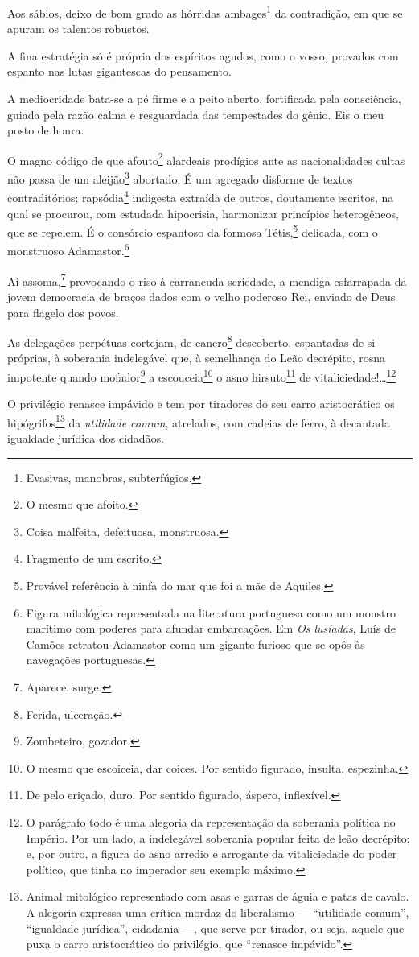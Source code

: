 Aos sábios, deixo de bom grado as hórridas ambages\footnote{Evasivas,
  manobras, subterfúgios.} da contradição, em que se apuram os talentos
robustos.

A fina estratégia só é própria dos espíritos agudos, como o vosso,
provados com espanto nas lutas gigantescas do pensamento.

A mediocridade bata-se a pé firme e a peito aberto, fortificada pela
consciência, guiada pela razão calma e resguardada das tempestades do
gênio. Eis o meu posto de honra.

O magno código de que afouto\footnote{O mesmo que afoito.} alardeais
prodígios ante as nacionalidades cultas não passa de um
aleijão\footnote{Coisa malfeita, defeituosa, monstruosa.} abortado. É
um agregado disforme de textos contraditórios; rapsódia\footnote{
  Fragmento de um escrito.} indigesta extraída de outros, doutamente
escritos, na qual se procurou, com estudada hipocrisia, harmonizar
princípios heterogêneos, que se repelem. É o consórcio espantoso da
formosa Tétis,\footnote{Provável referência à ninfa do mar que foi a
  mãe de Aquiles.} delicada, com o monstruoso Adamastor.\footnote{
  Figura mitológica representada na literatura portuguesa como um
  monstro marítimo com poderes para afundar embarcações. Em \emph{Os
  lusíadas}, Luís de Camões retratou Adamastor como um gigante furioso
  que se opôs às navegações portuguesas.}

Aí assoma,\footnote{Aparece, surge.} provocando o riso à carrancuda
seriedade, a mendiga esfarrapada da jovem democracia de braços dados com
o velho poderoso Rei, enviado de Deus para flagelo dos povos.

As delegações perpétuas cortejam, de cancro\footnote{Ferida,
  ulceração.} descoberto, espantadas de si próprias, à soberania
indelegável que, à semelhança do Leão decrépito, rosna impotente quando
mofador\footnote{Zombeteiro, gozador.} a escouceia\footnote{O mesmo
  que escoiceia, dar coices. Por sentido figurado, insulta, espezinha.}
o asno hirsuto\footnote{De pelo eriçado, duro. Por sentido figurado,
  áspero, inflexível.} de vitaliciedade!\ldots{}\footnote{O parágrafo todo
  é uma alegoria da representação da soberania política no Império. Por
  um lado, a indelegável soberania popular feita de leão decrépito; e,
  por outro, a figura do asno arredio e arrogante da vitaliciedade do
  poder político, que tinha no imperador seu exemplo máximo.}

O privilégio renasce impávido e tem por tiradores do seu carro
aristocrático os hipógrifos\footnote{Animal mitológico representado
  com asas e garras de águia e patas de cavalo. A alegoria expressa uma
  crítica mordaz do liberalismo --- ``utilidade comum'', ``igualdade
  jurídica'', cidadania ---, que serve por tirador, ou seja, aquele que
  puxa o carro aristocrático do privilégio, que ``renasce impávido''.}
da \emph{utilidade comum}, atrelados, com cadeias de ferro, à decantada
igualdade jurídica dos cidadãos.

